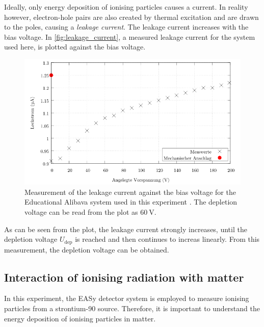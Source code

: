 Ideally, only energy deposition of ionising particles causes a current. In reality however, electron-hole pairs are also created by thermal excitation and are drawn to the poles,
causing a \textit{leakage current}. The leakage current increases with the bias voltage. In \autoref{fig:leakage_current}, a measured leakage current for the system used here,
is plotted against the bias voltage. 
\begin{figure}
    \centering 
    \includegraphics[width = .75\textwidth]{content/pics/leakage_current.png}
    \caption{Measurement of the leakage current against the bias voltage for the Educational Alibava system used in this experiment \cite{SiliconStrip}. 
    The depletion voltage can be read from the plot as $\qty{60}{\volt}$.}
    \label{fig:leakage_current}
\end{figure}
As can be seen from the plot, the leakage current strongly increases, until the depletion voltage $U_\text{dep}$ is reached and then continues to increas linearly.
From this measurement, the depletion voltage can be obtained.

\subsection{Interaction of ionising radiation with matter}
In this experiment, the EASy detector system is employed to measure ionising particles from a strontium-90 source. 
Therefore, it is important to understand the energy deposition of ionising particles in matter.

